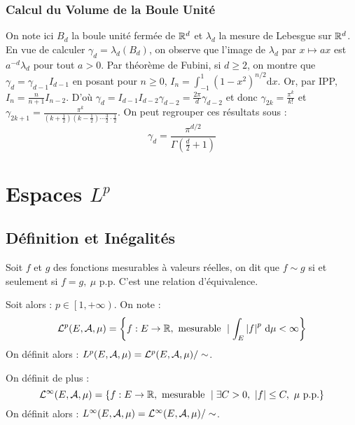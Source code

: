 \documentclass{cours}
\begin{document}
        \subsubsection{Calcul du Volume de la Boule Unité}
        On note ici $B_{d}$ la boule unité fermée de $\mathbb{R}^{d}$ et $\lambda_{d}$ la mesure de Lebesgue sur $\mathbb{R}^{d}$. En vue de calculer $\gamma_{d} = \lambda_{d}\left(B_{d}\right)$, on observe que l'image de $\lambda_{d}$ par $x \mapsto ax$ est $a^{-d}\lambda_{d}$ pour tout $a > 0$.
        Par théorème de Fubini, si $d \geq 2$, on montre que $\gamma_{d} = \gamma_{d-1} I_{d-1}$ en posant pour $n \geq 0$, $I_{n} = \int_{-1}^{1}\left(1 - x^{2}\right)^{n/2}\mathrm{d}x$.
        Or, par IPP, $I_{n} = \frac{n}{n + 1}I_{n-2}$. D'où $\gamma_{d} = I_{d-1}I_{d-2}\gamma_{d-2} = \frac{2\pi}{d}\gamma_{d-2}$ et donc $\gamma_{2k} = \frac{\pi^{k}}{k!}$ et $\gamma_{2k+1} = \frac{\pi^{k}}{\left(k + \frac{1}{2}\right)\left(k - \frac{1}{2}\right)\cdots \frac{3}{2}\cdot\frac{1}{2}}$.
        On peut regrouper ces résultats sous : 
        \[
            \gamma_{d} = \frac{\pi^{d/2}}{\Gamma\left(\frac{d}{2} + 1\right)}
        \]

    \section{Espaces $L^{p}$}
        \subsection{Définition et Inégalités}
        \begin{definition}
            Soit $f$ et $g$ des fonctions mesurables à valeurs réelles, on dit que $f \sim g$ si et seulement si $f = g, \ \mu$ p.p. C'est une relation d'équivalence. 
        \end{definition}

        \begin{definition}
            Soit alors : $p \in \left[1, +\infty\right)$. On note : 
            \[
                \mathcal{L}^{p}(E, \mathcal{A}, \mu) = \left\{f : E \rightarrow \mathbb{R}, \text{ mesurable } \mid \int_{E}\left|f\right|^{p}{\rm \, d} \mu < \infty \right\}
            \]
            On définit alors : $L^{p}(E, \mathcal{A}, \mu) = \mathcal{L}^{p}(E, \mathcal{A}, \mu)/\sim$.

            On définit de plus : 
            \[
                \mathcal{L}^{\infty}(E, \mathcal{A}, \mu) = \left\{f : E \rightarrow \mathbb{R}, \text{ mesurable } \mid \exists C > 0,\ \left|f\right| \leq C,\ \mu \text{ p.p.}\right\}
            \]
            On définit alors : $L^{\infty}(E, \mathcal{A}, \mu) = \mathcal{L}^{\infty}(E, \mathcal{A}, \mu)/\sim$.
        \end{definition}
\end{document}
